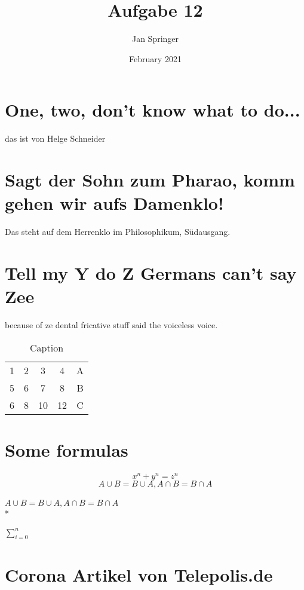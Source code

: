 \documentclass{scrartcl}
\title{Aufgabe 12}
\author{Jan Springer}
\date{February 2021}
\begin{document}
\maketitle

\section{One, two, don't know what to do...}
das ist von Helge Schneider

\section{Sagt der Sohn zum Pharao, komm gehen wir aufs Damenklo!}
Das steht auf dem Herrenklo im Philosophikum, Südausgang.

\section{Tell my Y do Z Germans can't say Zee}
because of ze dental fricative stuff said the voiceless voice.

\begin{table}[]
    \centering
    \begin{tabular}{cccc|c}
    \hline
        1 & 2 & 3 & 4 & A \\
        5 & 6 & 7 & 8 & B \\ \hline
        6 & 8 & 10 & 12& C \\
    \end{tabular}
    \caption{Caption}
    \label{tab:my_label}
\end{table}

\section{ Some formulas }
\[ x^n + y^n = z^n \] 
\newline
\[ A \cup B = B \cup A, A \cap B = B \cap A \] %
\\
$ A \cup B = B \cup A, A \cap B = B \cap A $
\\*

 $\sum\limits_{i=0}^{n}$ %

\section{Corona Artikel von Telepolis.de}
\end{document}
